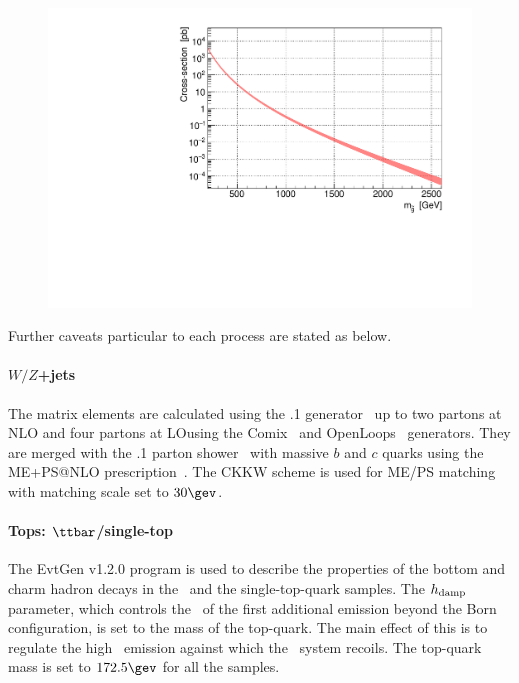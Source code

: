 \begin{figure}
  \begin{center}
    \includegraphics[width=140mm]{figures/Samples/xsec_GG/xsec_GG.pdf}
    \label{fig::Samples::xsec_GG}
  \end{center}
\end{figure}


\noindent Further caveats particular to each process are stated as below.

\paragraph{$W/Z$+jets} 
The matrix elements are calculated using the .1 generator~\cite{Gleisberg:2008ta} up to two partons at NLO and four partons at LO\@ using the Comix~\cite{Gleisberg:2008fv} and OpenLoops~\cite{Cascioli:2011va} generators. 
They are merged with the .1 parton shower~\cite{Schumann:2007mg} with massive $b$ and $c$ quarks using the ME+PS@NLO prescription~\cite{Hoeche:2012yf}.
The CKKW scheme is used for ME/PS matching with matching scale set to $30\gev$.


\paragraph{Tops: $\ttbar$/single-top}
The EvtGen v1.2.0 program is used to describe the properties of the bottom and charm hadron decays in the \ttbar\ and the single-top-quark samples. 
The $h_{\rm damp}$ parameter, which controls the \pt\ of the first additional emission beyond the Born configuration, is set to the mass of the top-quark. 
The main effect of this is to regulate the high \pt\ emission against which the \ttbar\ system recoils. The top-quark mass is set to $172.5 \gev$ for all the samples. 

